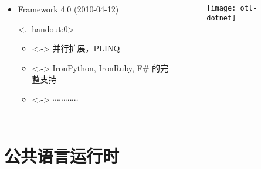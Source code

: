 \begin{frame}
\begin{columns}[t]
\begin{itemize}[<+->]
\item Framework 4.0 (2010-04-12)

\only<.| handout:0>{
\begin{itemize}
\item<.-> 并行扩展，PLINQ
\item<.-> IronPython, IronRuby, F\# 的完整支持
\item<.-> $\cdots \cdots \cdots \cdots$
\end{itemize}}
\end{itemize}

\begin{figure}
\centerline{\texttt{[image: otl-dotnet]}}
\end{figure}
\end{columns}

\end{frame}


\section{公共语言运行时}

